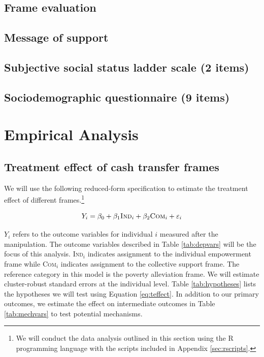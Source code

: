 \documentclass[11pt, a4paper]{article}\usepackage[]{graphicx}\usepackage[]{color}
\begin{document}
    \subsection{Frame evaluation}
    \subsection{Message of support}
    \subsection{Subjective social status ladder scale (2 items)}
    \subsection{Sociodemographic questionnaire (9 items)}

\section{Empirical Analysis}

    \subsection{Treatment effect of cash transfer frames}


        We will use the following reduced-form specification to estimate the treatment effect of different frames.\footnote{We will conduct the data analysis outlined in this section using the R programming language with the scripts included in Appendix \ref{sec:rscripts}.}

  		\begin{equation} \label{eq:teffect}
            Y_{i} = \beta_{0} + \beta_{1}\text{\textsc{Ind}}_{i} + \beta_{2}\text{\textsc{Com}}_{i} + \varepsilon_{i}
		\end{equation}


        $Y_{i}$ refers to the outcome variables for individual $i$ measured after the manipulation. The outcome variables described in Table \ref{tab:depvars} will be the focus of this analysis. \textsc{Ind}$_{i}$ indicates assignment to the individual empowerment frame while \textsc{Com}$_{i}$ indicates assignment to the collective support frame. The reference category in this model is the poverty alleviation frame. We will estimate cluster-robust standard errors at the individual level. Table \ref{tab:hypotheses} lists the hypotheses we will test using Equation \ref{eq:teffect}. In addition to our primary outcomes, we estimate the effect on intermediate outcomes in Table \ref{tab:mechvars} to test potential mechanisms.
\end{document}
